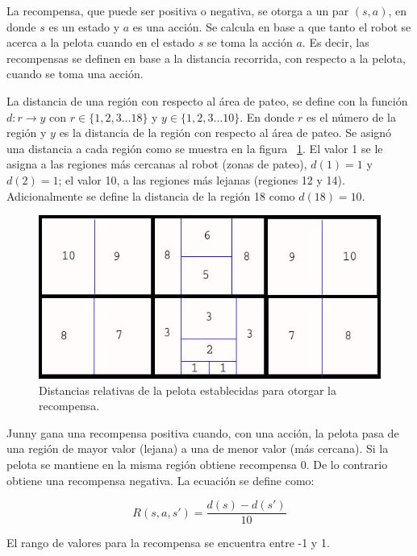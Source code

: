 La recompensa, que puede ser positiva o negativa, se otorga a un par $(s,a)$, en donde $s$ es un estado y $a$ es una acci\'on. Se calcula en base a que tanto el robot se acerca a la pelota cuando en el estado $s$ se toma la acci\'on $a$. Es decir, las recompensas se definen en base a la distancia recorrida, con respecto a la pelota, cuando se toma una acci\'on.  

La distancia de una región con respecto al área de pateo, se define con la función $d: r \rightarrow y$ con $r \in \{1,2,3 ...18\}$ y $y \in \{1,2,3 ...10\}$. En donde $r$ es el número de la región y $y$ es la distancia de la región con respecto al \'area de pateo. Se asign\'o una distancia a cada regi\'on como se muestra en la figura ~\ref{fig:distancias}. El valor 1 se le asigna a las regiones m\'as cercanas al robot (zonas de pateo), $d(1)= 1$ y $d(2)=1$; el valor 10, a las regiones m\'as lejanas (regiones 12 y 14). Adicionalmente se define la distancia de la región 18 como $d(18)=10$. 
     
\begin{figure}[hbtp]
\centering
\includegraphics[scale=0.5]{imagenes/Distancias2.jpg}
\caption{Distancias relativas de la pelota establecidas para otorgar la recompensa.}
\label{fig:distancias}
\end{figure}

Junny gana una recompensa positiva cuando, con una acción, la pelota pasa de una región de mayor valor (lejana) a una de menor valor (más cercana). Si la pelota se mantiene en la misma región obtiene recompensa 0. De lo contrario obtiene una recompensa negativa. La ecuación se define como:



\begin{equation}
R(s,a,s') = \dfrac{d(s) - d(s')}{10}
\end{equation}


El rango de valores para la recompensa se encuentra entre -1 y 1. 


